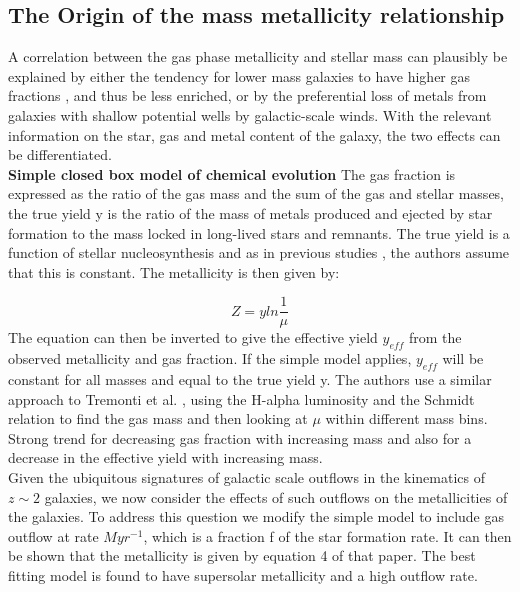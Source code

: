 \documentclass{literature}
\begin{document}
\subsection{The Origin of the mass metallicity relationship}
A correlation between the gas phase metallicity and stellar mass can plausibly be explained by either the tendency for lower mass galaxies to have higher gas fractions \citep{McGaugh_1997}, \citep{Bell_2000} and thus be less enriched, or by the preferential loss of metals from galaxies with shallow potential wells by galactic-scale winds. With the relevant information on the star, gas and metal content of the galaxy, the two effects can be differentiated. \\ 
\textbf{Simple closed box model of chemical evolution}
The gas fraction is expressed as the ratio of the gas mass and the sum of the gas and stellar masses, the true yield y is the ratio of the mass of metals produced and ejected by star formation to the mass locked in long-lived stars and remnants. The true yield is a function of stellar nucleosynthesis and as in previous studies \citep{Tremonti_2004}, \citep{Garnett_2002} the authors assume that this is constant. The metallicity is then given by: 

\begin{equation}
	Z = yln\frac{1}{\mu}
\end{equation}
The equation can then be inverted to give the effective yield $y_{eff}$ from the observed metallicity and gas fraction. If the simple model applies, $y_{eff}$ will be constant for all masses and equal to the true yield y. The authors use a similar approach to Tremonti et al. \citep{Tremonti_2004}, using the H-alpha luminosity and the Schmidt relation to find the gas mass and then looking at $\mu$ within different mass bins. Strong trend for decreasing gas fraction with increasing mass and also for a decrease in the effective yield with increasing mass. \\ 
Given the ubiquitous signatures of galactic scale outflows in the kinematics of $z \sim 2$ galaxies, we now consider the effects of such outflows on the metallicities of the galaxies. To address this question we modify the simple model to include gas outflow at rate $Myr^{-1}$, which is a fraction f of the star formation rate. It can then be shown that the metallicity is given by equation 4 of that paper. The best fitting model is found to have supersolar metallicity and a high outflow rate. 
\end{document}
